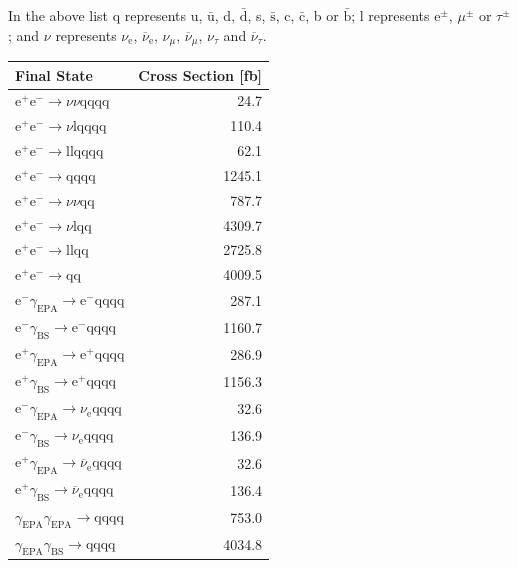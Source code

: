 %
\noindent In the above list q represents u, $\bar{\text{u}}$, d, $\bar{\text{d}}$, s, $\bar{\text{s}}$, c, $\bar{\text{c}}$, b or $\bar{\text{b}}$;  l represents $\text{e}^{\pm}$, $\mu^{\pm}$ or $\tau^{\pm}$; and $\nu$ represents $\nu_{\text{e}}$, $\overline{\nu}_{\text{e}}$, $\nu_{\mu}$, $\overline{\nu}_{\mu}$, $\nu_{\tau}$ and $\overline{\nu}_{\tau}$.
%
\begin{table}[h!]
\centering
\begin{tabular}{ l r }
\hline
Final State & Cross Section [fb] \\ 
\hline
$\text{e}^{+}\text{e}^{-} \rightarrow \nu{\nu}\text{qqqq}$ & 24.7 \\
$\text{e}^{+}\text{e}^{-} \rightarrow \nu\text{lqqqq}$ & 110.4\\
$\text{e}^{+}\text{e}^{-} \rightarrow \text{llqqqq}$ & 62.1\\
$\text{e}^{+}\text{e}^{-} \rightarrow \text{qqqq}$ & 1245.1\\
$\text{e}^{+}\text{e}^{-} \rightarrow \nu{\nu}\text{qq}$ & 787.7\\
$\text{e}^{+}\text{e}^{-} \rightarrow \nu\text{lqq}$ & 4309.7\\
$\text{e}^{+}\text{e}^{-} \rightarrow \text{llqq}$ & 2725.8\\
$\text{e}^{+}\text{e}^{-} \rightarrow \text{qq}$ & 4009.5\\
$\text{e}^{-}\gamma_{\text{EPA}} \rightarrow \text{e}^{-}\text{qqqq}$ & 287.1\\
$\text{e}^{-}\gamma_{\text{BS}} \rightarrow \text{e}^{-}\text{qqqq}$ & 1160.7\\
$\text{e}^{+}\gamma_{\text{EPA}} \rightarrow \text{e}^{+}\text{qqqq}$ & 286.9\\
$\text{e}^{+}\gamma_{\text{BS}} \rightarrow \text{e}^{+}\text{qqqq}$ & 1156.3\\
$\text{e}^{-}\gamma_{\text{EPA}} \rightarrow \nu_{\text{e}}\text{qqqq}$ & 32.6\\
$\text{e}^{-}\gamma_{\text{BS}} \rightarrow \nu_{\text{e}}\text{qqqq}$ & 136.9\\
$\text{e}^{+}\gamma_{\text{EPA}} \rightarrow \overline{\nu}_{\text{e}}\text{qqqq}$ & 32.6\\
$\text{e}^{+}\gamma_{\text{BS}} \rightarrow \overline{\nu}_{\text{e}}\text{qqqq}$ & 136.4\\
$\gamma_{\text{EPA}}\gamma_{\text{EPA}} \rightarrow \text{qqqq}$ & 753.0\\
$\gamma_{\text{EPA}}\gamma_{\text{BS}} \rightarrow \text{qqqq}$ & 4034.8\\

\end{tabular}
\end{table}
